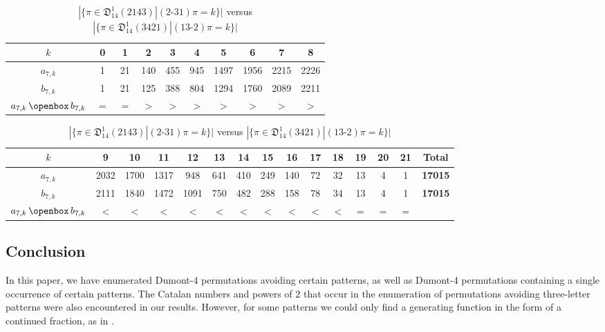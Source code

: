 \documentclass[
final
]{dmtcs-episciences}
\theoremstyle{definition}
\theoremstyle{remark}
\begin{document}
\begin{table}[!h]
\begin{flushleft}
\begin{tabular}{c||c|c|c|c|c|c|c|c|c}
	$k$  &0 & 1 & 2 & 3 & 4 & 5 & 6 & 7 & 8\\
	\hline 
	$a_{7,k}$ & 1 & 21 & 140 & 455 & 945 & 1497 & 1956 & 2215 & 2226\\
	\hline
	$b_{7,k}$ & 1 & 21 & 125 & 388 & 804 & 1294 & 1760 & 2089 & 2211 \\
	\hline
	$a_{7,k} \, \openbox \, b_{7,k}$ & $=$ & $=$ & $>$ & $>$ & $>$ & $>$ & $>$ & $>$ & $>$ 
\end{tabular}
\end{flushleft}
%
\begin{flushright}
\begin{tabular}{c||c|c|c|c|c|c|c|c|c|c|c|c|c||c}
	$k$  &9 &10 &11 &12 &13 &14 &15 &16 &17 &18 &19 &20 &21 & \textbf{Total}\\
	\hline 
	$a_{7,k}$ & 2032 & 1700 & 1317 & 948 & 641 & 410 & 249 & 140 & 72 & 32 & 13 & 4 & 1 & \textbf{17015}\\
	\hline
	$b_{7,k}$ & 2111 & 1840 & 1472 & 1091 & 750 & 482 & 288 & 158 & 78 & 34 & 13 & 4 & 1 & \textbf{17015}\\
	\hline
	$a_{7,k} \, \openbox \, b_{7,k}$ & $<$ & $<$ & $<$ & $<$ & $<$ & $<$ & $<$ & $<$ & $<$ & $<$ & $=$ & $=$ & $=$
\end{tabular}
\end{flushright}
\caption{$|\{\pi \in \mathfrak{D}^1_{14} (2143) | (2\text{-}31)\pi = k\}|$ versus $|\{\pi \in \mathfrak{D}^1_{14} (3421) | (13\text{-}2)\pi = k\}|$}
\label{table:cum_dist3}
\end{table}

\subsection{Conclusion}

In this paper, we have enumerated Dumont-4 permutations avoiding certain patterns, as well as Dumont-4 permutations containing a single occurrence of certain patterns. 
The Catalan numbers and powers of $2$ that occur in the enumeration of permutations avoiding three-letter patterns were also encountered in our results. However, for some patterns we could only find a generating function in the form of a continued fraction, as in \cite{RWZ}.
\end{document}
